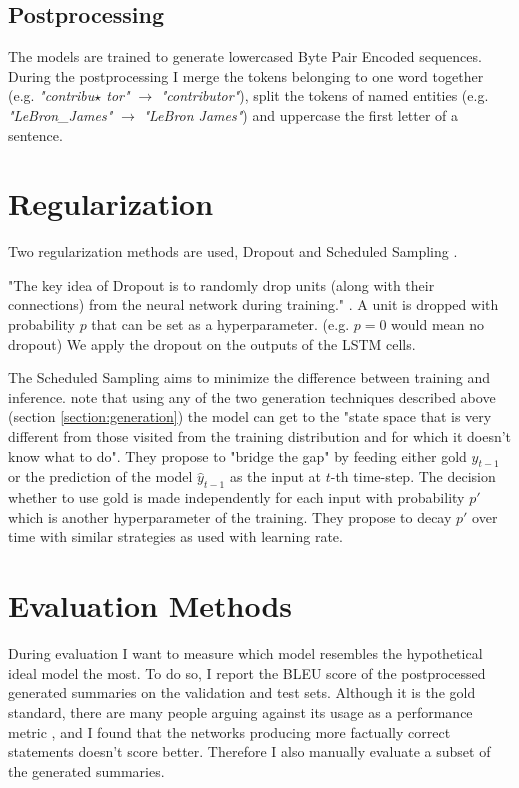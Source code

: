\subsection{Postprocessing}

The models are trained to generate lowercased Byte Pair Encoded sequences. During the postprocessing I merge the tokens belonging to one word together (e.g. \emph{"contribu$\star$ tor"} $\rightarrow$ \emph{"contributor"}), split the tokens of named entities (e.g. \emph{"LeBron\_James"} $\rightarrow$ \emph{"LeBron James"}) and uppercase the first letter of a sentence.

\section{Regularization}

Two regularization methods are used, Dropout and Scheduled Sampling \citep{bengio2015scheduled}.

"The key idea of Dropout is to randomly drop units (along with their connections) from the neural network during training." \citep{srivastavaDropout2014}. A unit is dropped with probability $p$ that can be set as a hyperparameter. (e.g. $p = 0$ would mean no dropout)  We apply the dropout on the outputs of the LSTM cells.

The Scheduled Sampling aims to minimize the difference between training and inference. \citep{bengio2015scheduled} note that using any of the two generation techniques described above (section \ref{section:generation}) the model can get to the "state space that is very different from those visited from the  training distribution and for which it doesn’t know what to do". They propose to "bridge the gap" by feeding either gold $y_{t-1}$ or the prediction of the model $\hat{y}_{t-1}$ as the input at $t$-th time-step. The decision whether to use gold is made independently for each input with probability $p'$ which is another hyperparameter of the training. They propose to decay $p'$ over time with similar strategies as used with learning rate.

\section{Evaluation Methods}

During evaluation I want to measure which model resembles the hypothetical ideal model the most. To do so, I report the BLEU score \citep{papineni2002} of the postprocessed generated summaries on the validation and test sets. Although it is the gold standard, there are many people arguing against its usage as a performance metric \citep{celikyilmaz2021evaluation}, and I found that the networks producing more factually correct statements doesn't score better. Therefore I also manually evaluate a subset of the generated summaries.

